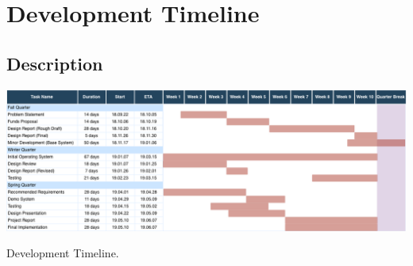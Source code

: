 \chapter{Development Timeline}

\section{Description}

\begin{table}[h]
  \includegraphics[width=\linewidth]{DevelopmentTimeline.png}
  \caption{Development Timeline.}
  \label{table:timeline}
\end{table}
